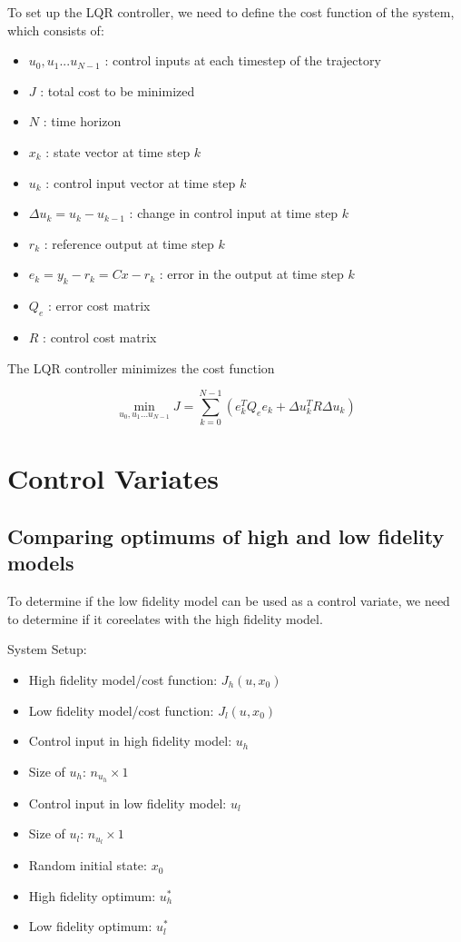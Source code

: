 \documentclass{article}
\begin{document}
To set up the LQR controller, we need to define the cost function of the system, which consists of:

\begin{itemize}
  \item $u_0, u_1 ... u_{N-1}$ : control inputs at each timestep of the trajectory
  \item $J$ : total cost to be minimized
  \item $N$ : time horizon
  \item $x_k$ : state vector at time step $k$
  \item $u_k$ : control input vector at time step $k$
  \item $\Delta u_k = u_k - u_{k-1}$ : change in control input at time step $k$
  \item $r_k$ : reference output at time step $k$
  \item $e_k = y_k - r_k = Cx - r_k$ : error in the output at time step $k$
  \item $Q_e$ : error cost matrix
  \item $R$ : control cost matrix
\end{itemize}
The LQR controller minimizes the cost function

\begin{equation}
  \min_{u_0, u_1 ... u_{N-1}}J = \sum_{k=0}^{N-1} (e_k^T Q_e e_k + \Delta u_k^T R \Delta u_k)
\end{equation}

\section{Control Variates}

\subsection{Comparing optimums of high and low fidelity models} \label{comp_opt}

To determine if the low fidelity model can be used as a control variate, we need to determine if it coreelates with the high fidelity model.

System Setup:
\begin{itemize}
  \item High fidelity model/cost function: $J_h(u, x_0)$
  \item Low fidelity model/cost function: $J_l(u, x_0)$
  \item Control input in high fidelity model: $u_h$
  \item Size of $u_h$: $n_{u_h} \times 1$
  \item Control input in low fidelity model: $u_l$
  \item Size of $u_l$: $n_{u_l} \times 1$
  \item Random initial state: $x_0$
  \item High fidelity optimum: $u_h^*$
  \item Low fidelity optimum: $u_l^*$
\end{itemize}
\end{document}
